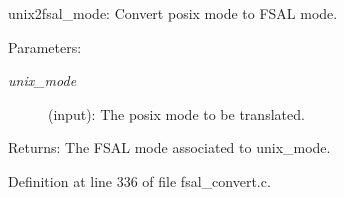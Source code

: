 unix2fsal\_\-mode: Convert posix mode to FSAL mode.

\begin{Desc}
\item[Parameters:]
\begin{description}
\item[{\em unix\_\-mode}](input): The posix mode to be translated.\end{description}
\end{Desc}
\begin{Desc}
\item[Returns:]The FSAL mode associated to unix\_\-mode. \end{Desc}


Definition at line 336 of file fsal\_\-convert.c.